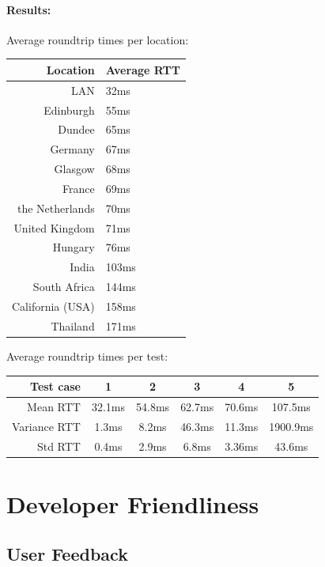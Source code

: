\documentclass[12pt]{article}
\begin{document}
\paragraph{Results:}Average roundtrip times per location:
\begin{center}
  \begin{tabular}{ r | l }
Location		& Average RTT \\ \hline\hline
LAN				& 32ms	\\
Edinburgh		& 55ms	\\
Dundee			& 65ms	\\
Germany			& 67ms	\\
Glasgow			& 68ms	\\
France			& 69ms	\\
the Netherlands	& 70ms	\\
United Kingdom	& 71ms	\\
Hungary			& 76ms	\\
India			& 103ms	\\
South Africa	& 144ms	\\
California (USA)& 158ms	\\
Thailand		& 171ms	\\
  \end{tabular}
\end{center}

Average roundtrip times per test:
\begin{center}
  \begin{tabular}{ | r || c | c | c | c | c |}
    \hline
    Test case 		& 1 		& 2 		& 3 		& 4 		& 5 		\\ \hline\hline
    Mean RTT 		& 32.1ms 	& 54.8ms 	& 62.7ms 	& 70.6ms 	& 107.5ms	\\ \hline
    Variance RTT 	& 1.3ms 	& 8.2ms 	& 46.3ms 	& 11.3ms 	& 1900.9ms	\\ \hline
    Std RTT			& 0.4ms		& 2.9ms		& 6.8ms		& 3.36ms	& 43.6ms	\\ \hline
  \end{tabular}
\end{center}







\section{Developer Friendliness}
\subsection{User Feedback}
\end{document}
